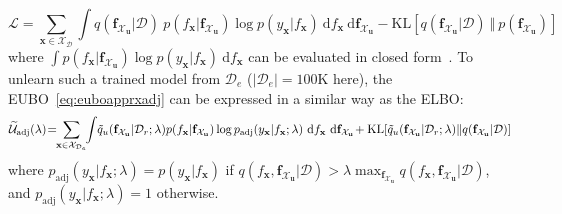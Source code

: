\documentclass{article}
\theoremstyle{definition}
\newcommand{\mbf}[1]{\mathbf{#1}}
\newcommand{\mcl}[1]{\mathcal{#1}}
\newcommand{\dr}{\mcl{D}_e}
\newcommand{\eubo}{\tilde{q}_u}
\begin{document}
%
\begin{equation}
\mcl{L} = \sum_{\mbf{x} \in \mcl{X}_{\mcl{D}}} \int q(\mbf{f}_{\mcl{X}_\mbf{u}}|\mcl{D})\  p(f_{\mbf{x}}| \mbf{f}_{\mcl{X}_\mbf{u}}) \log p(y_{\mbf{x}}|f_{\mbf{x}})\ \text{d}f_{\mbf{x}}\ \text{d}\mbf{f}_{\mcl{X}_\mbf{u}} 
	- \text{KL}[q(\mbf{f}_{\mcl{X}_\mbf{u}}|\mcl{D})\ \Vert\ p(\mbf{f}_{\mcl{X}_\mbf{u}})]
\label{eq:elbosvi}
\end{equation}
%
where $\int p(f_{\mbf{x}}| \mbf{f}_{\mcl{X}_\mbf{u}}) \log p(y_{\mbf{x}}|f_{\mbf{x}})\ \text{d}f_{\mbf{x}}$ can be evaluated in closed form~\cite{gal2014variational}.
To unlearn such a trained model from $\dr$ ($|\dr|=100$K here), the  EUBO~\eqref{eq:euboapprxadj} can be expressed in a similar way as the ELBO:
%
\begin{equation*}
\widetilde{\mcl{U}}_{\text{adj}}(\lambda)\hspace{-0.7mm}=\hspace{-1.2mm}\sum_{\mbf{x} \in \mcl{X}_{\dr}}\hspace{-1mm} \int\hspace{-0.7mm} \tilde{q}_u(\mbf{f}_{\mcl{X}_\mbf{u}}|\mcl{D}_r; \lambda) p(f_{\mbf{x}}| \mbf{f}_{\mcl{X}_\mbf{u}}) \log p_{\text{adj}}(y_{\mbf{x}}| f_{\mbf{x}}; \lambda)\ \text{d}f_{\mbf{x}}\ \text{d}\mbf{f}_{\mcl{X}_\mbf{u}} 
    \hspace{-0.5mm}+ \text{KL}[\eubo(\mbf{f}_{\mcl{X}_\mbf{u}}|\mcl{D}_r; \lambda) \Vert q(\mbf{f}_{\mcl{X}_\mbf{u}}|\mcl{D})]
\end{equation*}
%
where $p_{\text{adj}}(y_{\mbf{x}}| f_{\mbf{x}}; \lambda) = p(y_{\mbf{x}}| f_{\mbf{x}})$ if 
$q(f_{\mbf{x}},\mbf{f}_{\mcl{X}_\mbf{u}}|\mcl{D}) > \lambda \max_{\mbf{f}_{\mcl{X}_\mbf{u}}} q(f_{\mbf{x}},\mbf{f}_{\mcl{X}_\mbf{u}}|\mcl{D})$, 
and $p_{\text{adj}}(y_{\mbf{x}}| f_{\mbf{x}}; \lambda) = 1$ otherwise.
\end{document}
